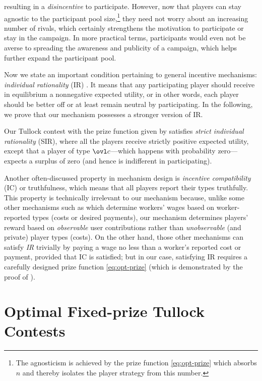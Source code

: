 \documentclass{sig-alternate-10pt}
\begin{document}
\begin{itemize}[leftmargin=0.8em]
resulting in a {\em disincentive} to participate.  However, now that players can stay agnostic to the participant pool size,\footnote{The agnosticism is achieved by the prize function \eqref{eq:opt-prize} which absorbs $n$ and thereby isolates the player strategy from this number.} they need not worry about an increasing number of rivals, which certainly strengthens the motivation to participate or stay in the campaign. In more practical terms, participants would even not be averse to spreading the awareness and publicity of a campaign, which helps further expand the participant pool.
\end{itemize}

Now we state an important condition pertaining to general incentive mechanisms: {\em individual rationality} (IR) \cite{Jackson03md}. It means that any participating player should receive in equilibrium a nonnegative expected utility, or in other words, each player should be better off or at least remain neutral by participating. In the following, we prove that our mechanism possesses a stronger version of IR.
\begin{prop}\label{thm:IR}
Our Tullock contest with the prize function given by  satisfies {\em strict individual rationality} (SIR), where all the players receive strictly positive expected utility, except that a player of type $\ovl c$---which happens with probability zero---expects a surplus of zero (and hence is indifferent in participating).
\end{prop}

Another often-discussed property in mechanism design is {\em incentive compatibility} (IC) \cite{Jackson03md} or truthfulness, which means that all players report their types truthfully. This property is technically irrelevant to our mechanism because, unlike some other mechanisms such as \cite{yang12mobicom,kout13infocom} which determine workers' wages based on worker-reported types (costs or desired payments), our mechanism determines players' reward based on {\em observable} user contributions rather than {\em unobservable} (and private) player types (costs). On the other hand, those other mechanisms can satisfy {\em IR} trivially by paying a wage no less than a worker's reported cost or payment, provided that IC is satisfied; but in our case, satisfying IR requires a carefully designed prize function \eqref{eq:opt-prize} (which is demonstrated by the proof of ).

\section{Optimal Fixed-prize Tullock Contests}\label{sec:opt-fixed}
\end{document}
